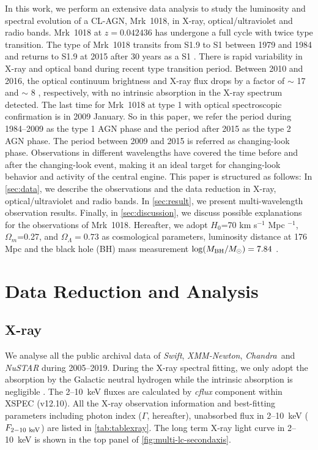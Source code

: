 \documentclass[twocolumn]{aastex63}
\newcommand{\xmm}{{\em XMM-Newton}}
\newcommand{\nustar}{{\em NuSTAR }}
\newcommand{\chandra}{{\em Chandra}}
\newcommand{\swift}{{\small \it Swift}}
\begin{document}
In this work, we perform an extensive data analysis to study the luminosity and spectral evolution of a CL-AGN, Mrk~1018, in X-ray, optical/ultraviolet and radio bands. Mrk~1018 at $z=0.042436$ has undergone a full cycle with twice type transition. The type of Mrk~1018 transits from S1.9 to S1 between 1979 and 1984 \citep{1986ApJ...311..135C} and returns to S1.9 at 2015 after 30 years as a S1 \citep[see also][]{2016A&A...593L...8M,2016A&A...593L...9H,2017A&A...607L...9K}. There is rapid variability in X-ray and optical band during recent type transition period. Between 2010 and 2016, the optical continuum brightness and X-ray flux drops by a factor of $\sim$ 17 and $\sim$ 8 \citep{2016A&A...593L...9H}, respectively, with no intrinsic absorption in the X-ray spectrum detected. The last time for Mrk~1018 at type 1 with optical spectroscopic confirmation is in 2009 January. So in this paper, we refer the period during 1984--2009 as the type 1 AGN phase and the period after 2015 as the type 2 AGN phase. The period between 2009 and 2015 is referred as changing-look phase. Observations in different wavelengths have covered the time before and after the changing-look event, making it an ideal target for changing-look behavior and activity of the central engine. This paper is structured as follows: In \autoref{sec:data}, we describe the observations and the data reduction in X-ray, optical/ultraviolet and radio bands. In \autoref{sec:result}, we present multi-wavelength observation results. Finally, in \autoref{sec:discussion}, we discuss possible explanations for the observations of Mrk~1018. Hereafter, we adopt $H_0$=70 km s$^{-1}$ Mpc $^{-1}$, $\Omega_{m}$=0.27, and $\Omega_{\Lambda}=0.73 $ as cosmological parameters, luminosity distance at 176 Mpc and the black hole (BH) mass measurement $\log(M_{\rm{BH}}/M_{\odot})=7.84$ \citep{2017MNRAS.472.3492E,2018MNRAS.480.3898N}. 


\section{Data Reduction and Analysis}\label{sec:data}
\subsection{X-ray}
We analyse all the public archival data of \swift, \xmm, \chandra ~and \nustar during 2005--2019. During the X-ray spectral fitting, we only adopt the absorption by the Galactic neutral hydrogen \citep[$N_{\rm{HI,Gal}}$=0.0243$\times10^{22}$cm$^{-2}$,][]{2005A&A...440..775K} 
while the intrinsic absorption is negligible \citep[see][]{2016A&A...593L...9H}. The 2--10~keV fluxes are calculated by {\it cflux} component within {\scriptsize XSPEC} (v12.10). All the X-ray observation information and best-fitting parameters including photon index ($\Gamma$, hereafter), unabsorbed flux in 2--10~keV ($F_{\rm{2-10~keV}}$) are listed in \autoref{tab:tablexray}. The long term X-ray light curve in 2--10~keV is shown in the top panel of \autoref{fig:multi-lc-secondaxis}.
\end{document}
